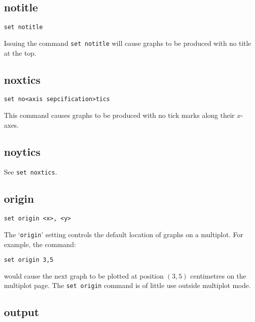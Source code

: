 \subsection{notitle}

\begin{verbatim}
set notitle
\end{verbatim}

Issuing the command {\tt set notitle} will cause graphs to be produced with no
title at the top.


\subsection{noxtics}

\begin{verbatim}
set no<axis sepcification>tics
\end{verbatim}

This command causes graphs to be produced with no tick marks along their $x$-axes.

\subsection{noytics}

See {\tt set noxtics}.


\subsection{origin}

\begin{verbatim}
set origin <x>, <y>
\end{verbatim}

The `{\tt origin}' setting controls the default location of graphs on a multiplot.
For example, the command:

\begin{verbatim}
set origin 3,5
\end{verbatim}

\noindent would cause the next graph to be plotted at position $(3,5)$ centimetres on the
multiplot page. The {\tt set origin} command is of little use outside multiplot
mode.


\subsection{output}

